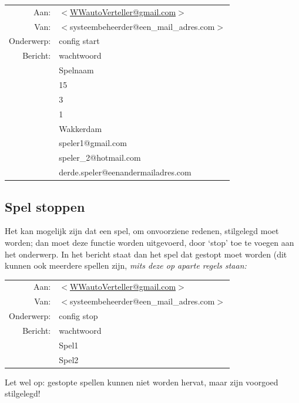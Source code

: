 \documentclass[12pt]{article}
\begin{document}
    \begin{center}
      \begin{tabularx}{0.75\textwidth}[c]{|r X|}
	\hline
	Aan: & \href{mailto:<WWautoVerteller@gmail.com>}{$<$WWautoVerteller@gmail.com$>$} \\
	Van: & $<$systeembeheerder@een\_mail\_adres.com$>$ \\
	Onderwerp: & config start \\[\baselineskip]	
	Bericht: & wachtwoord \\
	 & Spelnaam \\
	 & 15 \\
	 & 3 \\
	 & 1 \\
	 & Wakkerdam \\
	 & speler1@gmail.com \\
	 & speler\_2@hotmail.com \\
	 & derde.speler@eenandermailadres.com \\
	\hline
      \end{tabularx}
    \end{center}
  
  \subsection{Spel stoppen}
  
    Het kan mogelijk zijn dat een spel, om onvoorziene redenen, stilgelegd moet worden; dan moet deze functie worden uitgevoerd, door `stop' toe te voegen aan het onderwerp. In het bericht staat dan het spel dat gestopt moet worden (dit kunnen ook meerdere spellen zijn, \emph{mits deze op aparte regels staan:}
    
    \begin{center}
      \begin{tabularx}{0.75\textwidth}[c]{|r X|}
	\hline
	Aan: & \href{mailto:<WWautoVerteller@gmail.com>}{$<$WWautoVerteller@gmail.com$>$} \\
	Van: & $<$systeembeheerder@een\_mail\_adres.com$>$ \\
	Onderwerp: & config stop \\[\baselineskip]	
	Bericht: & wachtwoord \\
	 & Spel1 \\
	 & Spel2 \\
	\hline
      \end{tabularx}
    \end{center}
    
    Let wel op: gestopte spellen kunnen niet worden hervat, maar zijn voorgoed stilgelegd!
  
\end{document}

